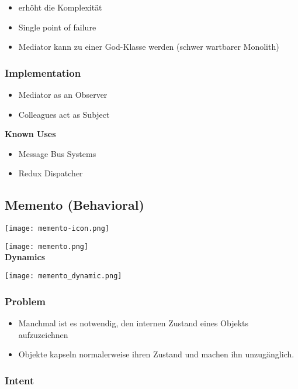 \begin{itemize}
    \item erhöht die Komplexität
    \item Single point of failure
    \item Mediator kann zu einer God-Klasse werden (schwer wartbarer Monolith)
\end{itemize}

\subsubsection{Implementation}
\begin{itemize}
    \item Mediator as an Observer
    \item Colleagues act as Subject
\end{itemize}
\vspace{10pt}
\textbf{Known Uses}
\begin{itemize}
    \item Message Bus Systems
    \item Redux Dispatcher
\end{itemize}

\subsection{Memento (Behavioral)}

\texttt{[image: memento-icon.png]}

\texttt{[image: memento.png]} \\

\textbf{Dynamics}

\texttt{[image: memento\_dynamic.png]}

\subsubsection{Problem}
\begin{itemize}
    \item Manchmal ist es notwendig, den internen Zustand eines Objekts aufzuzeichnen
    \item Objekte kapseln normalerweise ihren Zustand und machen ihn unzugänglich.
\end{itemize}

\subsubsection{Intent}

